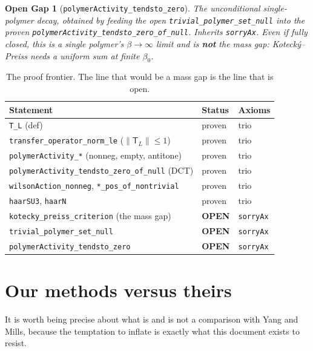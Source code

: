 \documentclass[11pt]{article}
\newtheorem*{opengap}{Open Gap}
\newcommand{\TL}{\mathsf{T}_L}
\newcommand{\code}[1]{\texttt{#1}}
\begin{document}
\begin{opengap}[\code{polymerActivity\_tendsto\_zero}]
The unconditional single-polymer decay, obtained by feeding the open
\code{trivial\_polymer\_set\_null} into the proven
\code{polymerActivity\_tendsto\_zero\_of\_null}. Inherits
\code{sorryAx}. Even if fully closed, this is a \emph{single}
polymer's $\beta\to\infty$ limit and is \textbf{not} the mass gap:
Koteck\'y--Preiss needs a uniform sum at finite $\beta_0$.
\end{opengap}

\begin{table}[h]
\centering
\begin{tabular}{|l|l|l|}
\hline
\textbf{Statement} & \textbf{Status} & \textbf{Axioms} \\
\hline
\code{T\_L} (def) & proven & trio \\
\code{transfer\_operator\_norm\_le} ($\lVert\TL\rVert\le 1$) & proven & trio \\
\code{polymerActivity\_*} (nonneg, empty, antitone) & proven & trio \\
\code{polymerActivity\_tendsto\_zero\_of\_null} (DCT) & proven & trio \\
\code{wilsonAction\_nonneg}, \code{*\_pos\_of\_nontrivial} & proven & trio \\
\code{haarSU3}, \code{haarN} & proven & trio \\
\hline
\code{kotecky\_preiss\_criterion} (the mass gap) & \textbf{OPEN} & \code{sorryAx} \\
\code{trivial\_polymer\_set\_null} & \textbf{OPEN} & \code{sorryAx} \\
\code{polymerActivity\_tendsto\_zero} & \textbf{OPEN} & \code{sorryAx} \\
\hline
\end{tabular}
\caption{The proof frontier. The line that would be a mass gap is the
line that is open.}
\end{table}

\section{Our methods versus theirs}

It is worth being precise about what is and is not a comparison with
Yang and Mills, because the temptation to inflate is exactly what
this document exists to resist.
\end{document}

